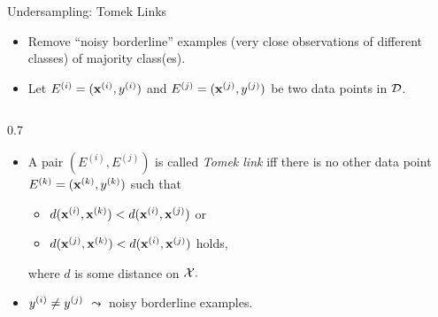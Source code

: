 \documentclass[10pt,compress,t,notes=noshow, xcolor=table]{beamer}
\begin{document}
\begin{frame}{Undersampling: Tomek Links}
    \small{

        \begin{itemize}            
            \item Remove ``noisy borderline'' examples (very close observations of different classes) of majority class(es).
            \item Let $E^{(i)} = (\xi,\yi)$ and $E^{(j)} = (\xv^{(j)},y^{(j)})$ be two data points in $\D$. %
        \end{itemize}
        \begin{columns}
            \begin{column}{0.7\textwidth}	
        
                \begin{itemize}

                    
                    \item A pair $(E^{(i)},E^{(j)})$ is called \emph{Tomek link} iff there is no other data point $E^{(k)} = (\xv^{(k)},y^{(k)})$ such that
        
                    \begin{itemize} 
                    \footnotesize
                
                       \item [] $d(\xv^{(i)}, \xv^{(k)}) < d(\xv^{(i)}, \xv^{(j)}) $ or
                       \item [] $d(\xv^{(j)}, \xv^{(k)}) < d(\xv^{(i)}, \xv^{(j)}) $ holds,
                    
                    \end{itemize}
        
                where $d$ is some distance on $\Xspace.$
                \item $\yi \neq \yi[j]$%
                $\leadsto$ noisy borderline examples.


\end{itemize}
\end{column}
\end{columns}}
\end{frame}
\end{document}
